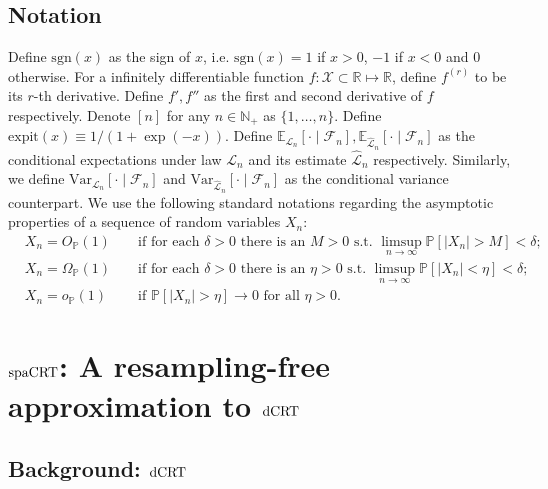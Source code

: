 \documentclass[12pt]{article}
\theoremstyle{definition}
\def\P{\mathbb{P}}
\def\sgn{\mathrm{sgn}}
\def\P{\mathbb{P}}
\newcommand{\E}{\mathbb E}								%
\newcommand{\V}{\mathrm{Var}}							%
\renewcommand{\P}{\mathbb{P}}							%
\newcommand{\expit}{\mathrm{expit}}                 	%
\newcommand{\law}{\mathcal L}							%
\newcommand{\lawhat}{\widehat{\mathcal L}}				%
\newcommand{\dCRT}{\textnormal{dCRT}} 					%
\newcommand{\spacrt}{\textnormal{spaCRT}}               %
\begin{document}
\subsection{Notation}

Define $\sgn(x)$ as the sign of $x$, i.e. $\sgn(x)=1$ if $x>0$, $-1$ if $x<0$ and $0$ otherwise. For a infinitely differentiable function $f:\mathcal{X}\subset\mathbb{R}\mapsto\mathbb{R}$, define $f^{(r)}$ to be its $r$-th derivative. Define $f',f''$ as the first and second derivative of $f$ respectively. Denote $[n]$ for any $n\in\mathbb{N}_+$ as $\{1,\ldots,n\}$. Define $\expit(x)\equiv 1/ (1+\exp(-x))$. Define $\E_{\law_n}[\cdot\mid\mathcal{F}_n],\E_{\lawhat_n}[\cdot\mid\mathcal{F}_n]$ as the conditional expectations under law $\law_n$ and its estimate $\lawhat_n$ respectively. Similarly, we define $\V_{\law_n}[\cdot\mid\mathcal{F}_n]$ and $\V_{\lawhat_n}[\cdot\mid\mathcal{F}_n]$ as the conditional variance counterpart. We use the following standard notations regarding the asymptotic properties of a sequence of random variables $X_n$:
\begin{align*}
  &X_n = O_{\P}(1) &&\text{ if for each } \delta > 0 \text{ there is an } M > 0 \text{ s.t. } \limsup_{n \rightarrow \infty}\P[|X_n| > M] < \delta; \\
  &X_n = \Omega_{\P}(1) &&\text{ if for each } \delta > 0 \text{ there is an } \eta > 0 \text{ s.t. } \limsup_{n \rightarrow \infty}\P[|X_n| < \eta] < \delta;\\
  &X_n = o_{\P}(1) &&\text{ if } \P[|X_n| > \eta] \rightarrow 0 \text{ for all } \eta > 0.
\end{align*}

\section{$\spacrt$: A resampling-free approximation to $\dCRT$} \label{sec:spacrt}

\subsection{Background: $\dCRT$}
\end{document}
